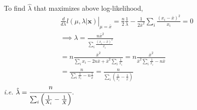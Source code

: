\documentclass[letterpaper]{article}
\newcommand{\bx}{\mathbf{x}}
\begin{document}
    To find $\hat \lambda$ that maximizes above log-likelihood, 
    \begin{eqnarray*}
    \left. \frac{d}{d\lambda} l(\mu, \lambda|\bx) \right|_{\mu = \bar x} =
    \frac{n}{2} \frac{1}{\lambda} -\frac{1}{2 \bar x^2} \sum_i \frac{(x_i-\bar x)^2}{x_i} = 0 \\
    \implies \lambda = \frac{n \bar x^2}{\sum_i \frac{(x_i - \bar x)^2}{x_i}} \\
    = n \frac{\bar x^2}{\sum_i x_i - 2n \bar x + \bar x^2 \sum_i \frac{1}{x_i}} = n \frac{\bar x^2}{\bar x^2 \sum_i \frac{1}{x_i} - n \bar x} \\
    = \frac{n}{\sum_i \frac{1}{x_i} - n \frac{1}{\bar x}} = \frac{n}{\sum_i \left(\frac{1}{x_i} - \frac{1}{\bar x}\right)}
    \end{eqnarray*}
    \emph{i.e.} $\hat \lambda = \cfrac{n}{\sum_i \left(\frac{1}{X_i} - \frac{1}{\bar X}\right)}$.
\end{document}

